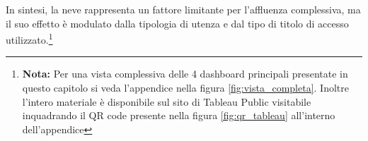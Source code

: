 In sintesi, la neve rappresenta un fattore limitante per l’affluenza complessiva, ma il suo effetto è modulato dalla tipologia di utenza e dal tipo di titolo di accesso utilizzato.\footnote{\textbf{Nota:} Per una vista complessiva delle 4 dashboard principali presentate in questo capitolo si veda l'appendice nella figura \ref{fig:vista_completa}.
Inoltre l'intero materiale è disponibile sul sito di Tableau Public visitabile inquadrando il QR code presente nella figura \ref{fig:qr_tableau} all'interno dell'appendice}


